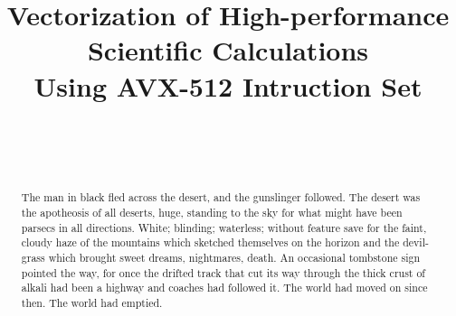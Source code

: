 \documentclass[
11pt,%
tightenlines,%
twoside,%
onecolumn,%
nofloats,%
nobibnotes,%
nofootinbib,%
superscriptaddress,%
noshowpacs,%
centertags]%
{revtex4}
\begin{document}

\title{Vectorization of High-performance Scientific Calculations\\
Using AVX-512 Intruction Set}

\author{~}

\author{~}




\begin{abstract} %
The man in black fled across the desert, and the gunslinger followed. The desert was the apotheosis of all deserts, huge, standing to the sky for what might have been parsecs in all directions. White; blinding; waterless; without feature save for the faint, cloudy haze of the mountains which sketched themselves on the horizon and the devil-grass which brought sweet dreams, nightmares, death. An occasional tombstone sign pointed the way, for once the drifted track that cut its way through the thick crust of alkali had been a highway and coaches had followed it. The world had moved on since then. The world had emptied.
\end{abstract}


\end{document}
